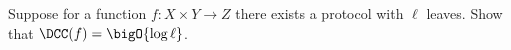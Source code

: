 Suppose for a function $f\colon X \times Y \to Z$ there exists a protocol with $\ell$ leaves. Show that
$\DCC(f) = \bigO{\log \ell}$.
